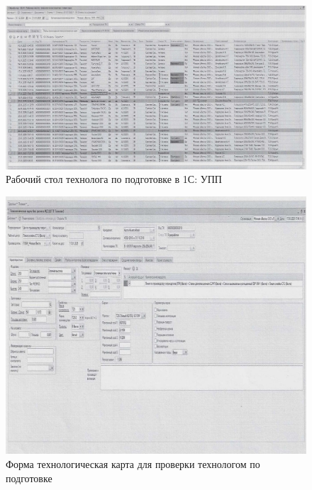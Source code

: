 
\begin{figure}
\begin{center}
 \includegraphics[height=0.35\textheight, keepaspectratio]{Pics/II.2.jpg}
\end{center}
 \caption{Рабочий стол технолога по подготовке в 1С: УПП}
 \label{pic:II.2}
\end{figure}


\begin{figure}
\begin{center}
 \includegraphics[height=0.4\textheight, keepaspectratio]{Pics/II.2..jpg}
\end{center}
 \caption{Форма технологическая карта для проверки технологом по подготовке}
 \label{pic:II.2.}
\end{figure}

